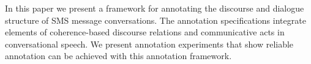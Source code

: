 In this paper we present a framework for annotating the discourse and dialogue structure of SMS message conversations. The annotation specifications integrate elements of coherence-based discourse relations and communicative acts in conversational speech. We present annotation experiments that show reliable annotation can be achieved with this annotation framework.
